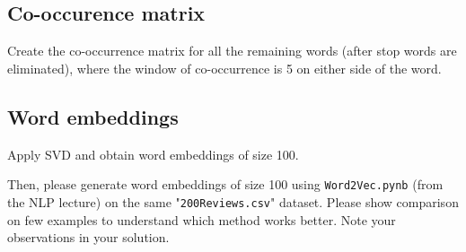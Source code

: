 \documentclass[12pt, letterpaper]{article}
\newcommand{\mybox}[1]{\par\noindent\colorbox{shadecolor}
{\parbox{\dimexpr\textwidth-2\fboxsep\relax}{#1}}}
\begin{document}
\subsection{Co-occurence matrix}
\mybox{Create the co-occurrence matrix for all the remaining words (after stop words are eliminated), where the window of co-occurrence is 5 on either side of the word.}

\subsection{Word embeddings}
\mybox{Apply SVD and obtain word embeddings of size 100.  

Then, please generate word embeddings of size 100 using \texttt{Word2Vec.pynb} (from the NLP lecture) on the same "\texttt{200Reviews.csv}" dataset. 
Please show comparison on few examples to understand which method works better. 
Note your observations in your solution.}
\end{document}
